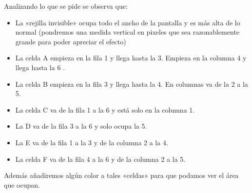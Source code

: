 \documentclass[letterpaper,10pt,spanish]{sphinxmanual}
\begin{document}
Analizando lo que se pide se observa que:
\begin{itemize}
\item {} 
La «rejilla invisible» ocupa todo el ancho de la pantalla y es más alta de lo normal (pondremos una medida vertical en pixeles que sea razonablemente grande para poder apreciar el efecto)

\item {} 
La celda A empieza en la fila 1 y llega hasta la 3. Empieza en la columna 4 y llega hasta la 6 .

\item {} 
La celda B empieza en la fila 3 y llega hasta la 4. En columnas va de la 2 a la 5.

\item {} 
La celda C va de la fila 1 a la 6 y está solo en la columna 1.

\item {} 
La D va de la fila 3 a la 6 y solo ocupa la 5.

\item {} 
La E va de la fila 1 a la 3 y de la columna 2 a la 4.

\item {} 
La celda F va de la fila 4 a la 6 y de la columna 2 a la 5.

\end{itemize}

Además añadiremos algún color a tales «celdas» para que podamos ver el área que ocupan.
\end{document}
